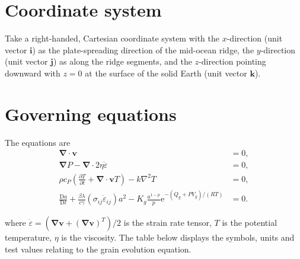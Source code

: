 \documentclass[a4paper]{article}
\newcommand{\Div}{{\boldsymbol{\nabla}}\cdot}
\newcommand{\Grad}{{\boldsymbol{\nabla}}}
\newcommand{\delsq}{\nabla^2}
\newcommand{\ldiff}[2]{\frac{\mathrm{D}{#1}}{\mathrm{D}{#2}}}
\newcommand{\strr}{\dot{\varepsilon}}
\newcommand{\ihat}{\boldsymbol{i}}
\newcommand{\jhat}{\boldsymbol{j}}
\newcommand{\khat}{\boldsymbol{k}}
\newcommand{\vel}{\boldsymbol{v}}
\begin{document}
\section{Coordinate system}

Take a right-handed, Cartesian coordinate system with the
$x$-direction (unit vector $\ihat$) as the plate-spreading direction
of the mid-ocean ridge, the $y$-direction (unit vector $\jhat$) as
along the ridge segments, and the $z$-direction pointing downward with
$z=0$ at the surface of the solid Earth (unit vector $\khat$). 

\section{Governing equations}

The equations are
\begin{align}
  \label{eq:gov_dimensional}
  \Div\vel &= 0,\\
  \Grad P - \Div 2\eta\strr &= 0,\\
  \rho c_P \left( \frac{\partial T}{\partial t} + \Div \vel T \right) - k\delsq T &= 0,\\
  \ldiff{a}{t} + \frac{\beta\lambda}{c\gamma}\left(\sigma_{ij}\strr_{ij}\right) a^2 - K_g\frac{a^{1-p}}{p}\textrm{e}^{-(Q_g + PV_g)/(RT)} &= 0.
\end{align}


where $\strr = (\Grad\vel + (\Grad\vel)^T)/2$ is the strain rate
tensor, $T$ is the potential temperature, $\eta$ is the viscosity.
The table below displays the symbols, units and test values relating
to the grain evolution equation.
\end{document}
